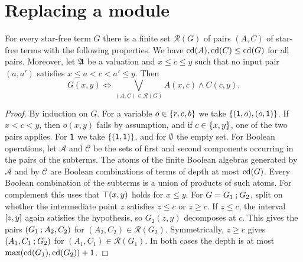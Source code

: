 \section{Replacing a module}\label{section: replacement}

\begin{lemma}[Seams]\label{lemma: seam}
  For every star-free term $G$ there is a finite set $\mathcal{R}(G)$ of pairs $(A, C)$ of star-free terms with the following properties.
  We have $\mathrm{cd}(A), \mathrm{cd}(C) \le \mathrm{cd}(G)$ for all pairs.
  Moreover, let $\mathfrak{A}$ be a valuation and $x \le c \le y$ such that no input pair $(a, a')$ satisfies $x \le a < c < a' \le y$.
  Then
  \[
    G(x, y) \iff \bigvee_{(A, C) \in \mathcal{R}(G)} A(x, c) \wedge C(c, y).
  \]
\end{lemma}
\begin{proof}
  By induction on $G$.
  For a variable $o \in \{r, c, b\}$ we take $\{(\mathsf{1}, o), (o, \mathsf{1})\}$.
  If $x < c < y$, then $o(x, y)$ fails by assumption, and if $c \in \{x, y\}$, one of the two pairs applies.
  For $\mathsf{1}$ we take $\{(\mathsf{1}, \mathsf{1})\}$, and for $\emptyset$ the empty set.
  For Boolean operations, let $\mathcal{A}$ and $\mathcal{C}$ be the sets of first and second components occurring in the pairs of the subterms.
  The atoms of the finite Boolean algebras generated by $\mathcal{A}$ and by $\mathcal{C}$ are Boolean combinations of terms of depth at most $\mathrm{cd}(G)$.
  Every Boolean combination of the subterms is a union of products of such atoms.
  For complement this uses that $\top(x, y)$ holds for $x \le y$.
  For $G = G_1 \mathbin{;} G_2$, split on whether the intermediate point $z$ satisfies $z \le c$ or $z \ge c$.
  If $z \le c$, the interval $[z, y]$ again satisfies the hypothesis, so $G_2(z, y)$ decomposes at $c$.
  This gives the pairs $(G_1 \mathbin{;} A_2, C_2)$ for $(A_2, C_2) \in \mathcal{R}(G_2)$.
  Symmetrically, $z \ge c$ gives $(A_1, C_1 \mathbin{;} G_2)$ for $(A_1, C_1) \in \mathcal{R}(G_1)$.
  In both cases the depth is at most $\max(\mathrm{cd}(G_1), \mathrm{cd}(G_2)) + 1$.
\end{proof}

